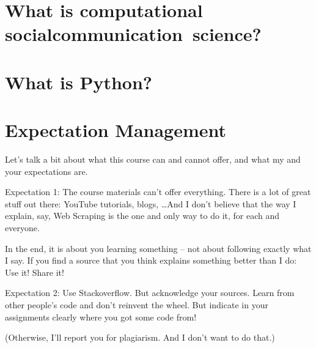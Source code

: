 \section[What is CSS\textbar CCS?]{What is computational \lbrack social\textbar communication\rbrack  ~science?}



\section{What is Python?}







\section{Expectation Management}


\begin{frame}[standout]
	Let's talk a bit about what this course can and cannot offer, and what my and your expectations are.
\end{frame}


\begin{frame}{Expectation 1: The course materials can't offer everything.}
There is a lot of great stuff out there: YouTube tutorials, blogs, \ldots And I don't believe that the way I explain, say, Web Scraping is the one and only way to do it, for each and everyone.

In the end, it is about you learning something -- not about following exactly what I say. If you find a source that you think explains something better than I do: Use it! Share it!
\end{frame}



\begin{frame}{Expectation 2: Use Stackoverflow. But acknowledge your sources.}
Learn from other people's code and don't reinvent the wheel. But indicate in your assignments clearly where you got some code from! 

(Otherwise, I'll report you for plagiarism. And I don't want to do that.)
\end{frame}





